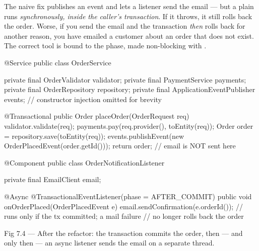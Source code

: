  The naive fix publishes an event and lets a listener send the email --- but a plain  runs \emph{synchronously, inside the caller's transaction}. If it throws, it still rolls back the order. Worse, if you send the email and the transaction \emph{then} rolls back for another reason, you have emailed a customer about an order that does not exist. The correct tool is  bound to the  phase, made non-blocking with .

\begin{javabox}
@Service
public class OrderService {
  private final OrderValidator validator;
  private final PaymentService payments;
  private final OrderRepository repository;
  private final ApplicationEventPublisher events;
  // constructor injection omitted for brevity

  @Transactional
  public Order placeOrder(OrderRequest req) {
    validator.validate(req);
    payments.pay(req.provider(), toEntity(req));
    Order order = repository.save(toEntity(req));
    events.publishEvent(new OrderPlacedEvent(order.getId()));
    return order;   // email is NOT sent here
  }
}
\end{javabox}

\begin{javabox}
@Component
public class OrderNotificationListener {
  private final EmailClient email;

  @Async
  @TransactionalEventListener(phase = AFTER_COMMIT)
  public void onOrderPlaced(OrderPlacedEvent e) {
    email.sendConfirmation(e.orderId());
    // runs only if the tx committed; a mail failure
    // no longer rolls back the order
  }
}
\end{javabox}

\begin{wbfigure}{Fig 7.4 — After the refactor: the transaction commits the order, then --- and only then --- an async listener sends the email on a separate thread.}
\end{wbfigure}

